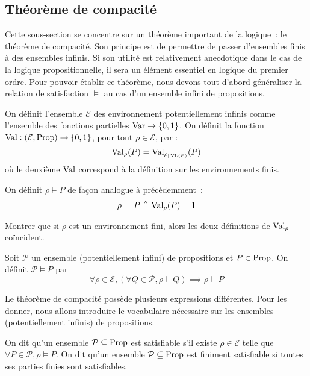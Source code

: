 \subsection{Théorème de compacité}

Cette sous-section se concentre sur un théorème important de la logique~: le
théorème de compacité. Son principe est de permettre de passer d'ensembles finis
à des ensembles infinis. Si son utilité est relativement anecdotique dans le cas
de la logique propositionnelle, il sera un élément essentiel en logique du
premier ordre. Pour pouvoir établir ce théorème, nous devons tout d'abord
généraliser la relation de satisfaction $\vDash$ au cas d'un ensemble infini de
propositions.

\begin{definition}
  On définit l'ensemble $\mathcal E$ des environnement potentiellement infinis
  comme l'ensemble des fonctions partielles $\operatorname{Var} \to \{0,1\}$. On définit la
  fonction $\operatorname{Val} : (\mathcal E,\operatorname{Prop})\to \{0,1\}$, pour tout
  $\rho\in\mathcal E$, par :
  \[\operatorname{Val}_\rho(P) = \operatorname{Val}_{\rho_{|\operatorname{VL}(P)}}(P)\]
  où le deuxième $\operatorname{Val}$ correspond à la définition sur les environnements finis.

  On définit $\rho\models P$ de façon analogue à précédemment~:
  \[\rho\models P \triangleq \operatorname{Val}_\rho(P) = 1\]
\end{definition}

\begin{exercise}
  Montrer que si $\rho$ est un environnement fini, alors les deux définitions de
  $\operatorname{Val}_\rho$ coïncident.
\end{exercise}

\begin{definition}
  Soit $\mathcal P$ un ensemble (potentiellement infini) de propositions et
  $P\in\operatorname{Prop}$. On définit $\mathcal P\vDash P$ par
  \[\forall \rho\in\mathcal E, (\forall Q \in\mathcal P, \rho\models Q)
  \implies \rho\models P\]
\end{definition}

Le théorème de compacité possède plusieurs expressions différentes. Pour les
donner, nous allons introduire le vocabulaire nécessaire sur les ensembles
(potentiellement infinis) de propositions.

\begin{definition}[Satisfiabilité]
  On dit qu'un ensemble $\mathcal P\subseteq\operatorname{Prop}$ est satisfiable s'il existe
  $\rho\in\mathcal E$ telle que $\forall P\in\mathcal P, \rho\models P$. On dit
  qu'un ensemble $\mathcal P\subseteq\operatorname{Prop}$ est finiment satisfiable si toutes
  ses parties finies sont satisfiables.
\end{definition}

